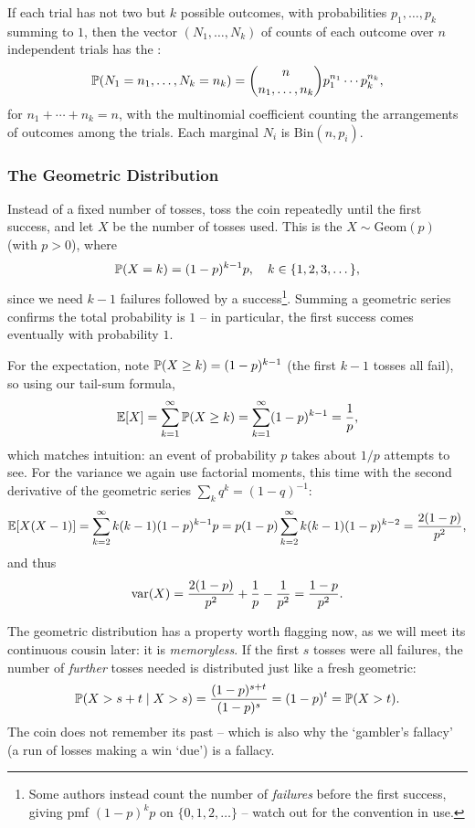 \documentclass[a4paper]{scrartcl}
\begin{document}
\begin{remark}
	If each trial has not two but $k$ possible outcomes, with probabilities $p_1, \dots, p_k$ summing to $1$, then the vector $(N_1, \dots, N_k)$ of counts of each outcome over $n$ independent trials has the :
	$$
	\mathbb{P}(N_1 = n_1, \dots, N_k = n_k) = \binom{n}{n_1, \dots, n_k}p_1^{n_1}\cdots p_k^{n_k},
	$$
	for $n_1 + \cdots + n_k = n$, with the multinomial coefficient counting the arrangements of outcomes among the trials. Each marginal $N_i$ is $\mathrm{Bin}(n, p_i)$.
\end{remark}

\subsubsection*{The Geometric Distribution}

Instead of a fixed number of tosses, toss the coin repeatedly until the first success, and let $X$ be the number of tosses used. This is the  $X \sim \mathrm{Geom}(p)$ (with $p > 0$), where
$$
\mathbb{P}(X = k) = (1 - p)^{k - 1} p, \quad k \in \{1, 2, 3, \dots \},
$$
since we need $k - 1$ failures followed by a success\footnote{Some authors instead count the number of \emph{failures} before the first success, giving pmf $(1-p)^k p$ on $\{0, 1, 2, \dots\}$ -- watch out for the convention in use.}. Summing a geometric series confirms the total probability is $1$ -- in particular, the first success comes eventually with probability $1$.

For the expectation, note $\mathbb{P}(X \geq k) = (1-p)^{k - 1}$ (the first $k - 1$ tosses all fail), so using our tail-sum formula,
$$
\mathbb{E}[X] = \sum_{k = 1}^{\infty} \mathbb{P}(X \geq k) = \sum_{k = 1}^{\infty} (1 - p)^{k - 1} = \frac{1}{p},
$$
which matches intuition: an event of probability $p$ takes about $1/p$ attempts to see. For the variance we again use factorial moments, this time with the second derivative of the geometric series $\sum_{k} q^k = (1-q)^{-1}$:
$$
\mathbb{E}[X(X-1)] = \sum_{k = 2}^{\infty} k(k - 1)(1-p)^{k-1} p = p(1-p)\sum_{k=2}^{\infty} k(k-1)(1-p)^{k - 2} = \frac{2(1-p)}{p^2},
$$
and thus
$$
\operatorname{var}(X) = \frac{2(1-p)}{p^2} + \frac{1}{p} - \frac{1}{p^2} = \frac{1 - p}{p^2}.
$$

The geometric distribution has a property worth flagging now, as we will meet its continuous cousin later: it is \emph{memoryless}. If the first $s$ tosses were all failures, the number of \emph{further} tosses needed is distributed just like a fresh geometric:
$$
\mathbb{P}(X > s + t \mid X > s) = \frac{(1-p)^{s + t}}{(1 - p)^s} = (1-p)^t = \mathbb{P}(X > t).
$$
The coin does not remember its past -- which is also why the `gambler's fallacy' (a run of losses making a win `due') is a fallacy.
\end{document}
